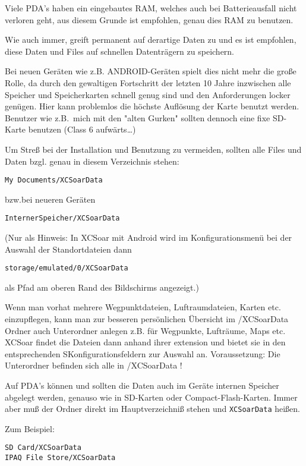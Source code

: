 Viele PDA's haben ein eingebautes RAM, welches auch bei Batterieausfall nicht verloren geht, aus diesem
Grunde ist empfohlen, genau dies RAM zu benutzen.

Wie auch immer, \xc greift permanent auf derartige Daten zu und es ist empfohlen, diese Daten und
Files auf schnellen Datenträgern zu speichern.

Bei neuen Geräten wie z.B. ANDROID-Geräten spielt dies nicht mehr die große Rolle, da durch den
gewaltigen Fortschritt der letzten 10 Jahre inzwischen alle Speicher und Speicherkarten schnell genug sind und den Anforderungen locker genügen. Hier kann problemlos die höchste Auflösung der Karte benutzt werden.
Benutzer wie z.B.\ mich mit den "alten Gurken" sollten dennoch eine fixe SD-Karte benutzen (Class 6
aufwärts\dots)


Um Streß bei der Installation und Benutzung zu vermeiden, sollten alle Files und Daten bzgl. \xc  genau in
diesem Verzeichnis stehen:

\begin{verbatim}
My Documents/XCSoarData
\end{verbatim}

bzw.bei neueren Geräten

\begin{verbatim}
InternerSpeicher/XCSoarData
\end{verbatim}

(Nur als Hinweis: In XCSoar mit Android wird im Konfigurationsmenü bei der Auswahl der Standortdateien dann
\begin{verbatim}
storage/emulated/0/XCSoarData 
\end{verbatim} 
als Pfad am oberen Rand des Bildschirms angezeigt.)

Wenn man vorhat mehrere Wegpunktdateien, Luftraumdateien, Karten etc. einzupflegen, kann man zur besseren persönlichen Übersicht im /XCSoarData Ordner auch Unterordner anlegen z.B. für Wegpunkte, Lufträume, Maps etc. 
XCSoar findet die Dateien dann anhand ihrer extension und bietet sie in den entsprechenden SKonfigurationsfeldern zur Auswahl an. Voraussetzung: Die Unterordner befinden sich alle in /XCSoarData !


Auf PDA's können und sollten die Daten auch im Geräte internen Speicher abgelegt werden, genauso wie in
SD-Karten oder Compact-Flash-Karten. Immer aber muß der Ordner direkt im Hauptverzeichniß stehen und
\verb|XCSoarData| heißen.

Zum Beispiel:
\begin{verbatim}
SD Card/XCSoarData
IPAQ File Store/XCSoarData
\end{verbatim}

